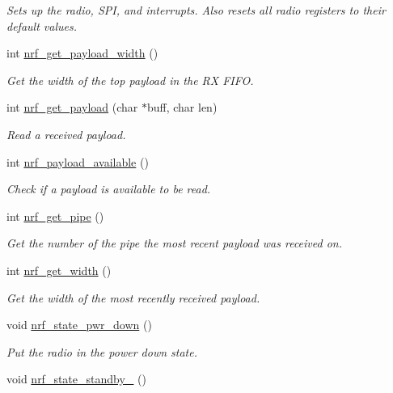 \begin{DoxyCompactItemize}
\begin{DoxyCompactList}\small\item\em Sets up the radio, S\+PI, and interrupts. Also resets all radio registers to their default values. \end{DoxyCompactList}\item 
int \hyperlink{group___user_func_ga5099baab714a8a73ae66a32ba3fe04a6}{nrf\+\_\+get\+\_\+payload\+\_\+width} ()
\begin{DoxyCompactList}\small\item\em Get the width of the top payload in the RX F\+I\+FO. \end{DoxyCompactList}\item 
int \hyperlink{group___user_func_ga6a6944aa00dfd20af0f540e93613e19a}{nrf\+\_\+get\+\_\+payload} (char $\ast$buff, char len)
\begin{DoxyCompactList}\small\item\em Read a received payload. \end{DoxyCompactList}\item 
int \hyperlink{group___user_func_ga66cbce1bcbd67f721f752d7848857b26}{nrf\+\_\+payload\+\_\+available} ()
\begin{DoxyCompactList}\small\item\em Check if a payload is available to be read. \end{DoxyCompactList}\item 
int \hyperlink{group___user_func_ga5bbcabdf5bea986738a069cdcdf7fd04}{nrf\+\_\+get\+\_\+pipe} ()
\begin{DoxyCompactList}\small\item\em Get the number of the pipe the most recent payload was received on. \end{DoxyCompactList}\item 
int \hyperlink{group___user_func_gaec88da95fdf7d2baea7a9c5ddcec492b}{nrf\+\_\+get\+\_\+width} ()
\begin{DoxyCompactList}\small\item\em Get the width of the most recently received payload. \end{DoxyCompactList}\item 
void \hyperlink{group___user_func_ga6473277a36d424febfdecb9aa3e0f6a2}{nrf\+\_\+state\+\_\+pwr\+\_\+down} ()\hypertarget{group___user_func_ga6473277a36d424febfdecb9aa3e0f6a2}{}\label{group___user_func_ga6473277a36d424febfdecb9aa3e0f6a2}

\begin{DoxyCompactList}\small\item\em Put the radio in the power down state. \end{DoxyCompactList}\item 
void \hyperlink{group___user_func_gab678d78f9d288d902289dae46e382148}{nrf\+\_\+state\+\_\+standby\+\_} ()\hypertarget{group___user_func_gab678d78f9d288d902289dae46e382148}{}\label{group___user_func_gab678d78f9d288d902289dae46e382148}


\end{DoxyCompactItemize}
